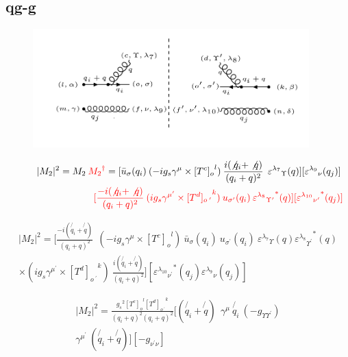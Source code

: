 \subsection{qg-g}
\begin{figure}[ht!]
\centering
\includegraphics[width=0.95\textwidth]{images/qggM2squer.png}
\end{figure}
\begin{equation}
\begin{split}
|M_2|^2=M_2\:{\color[RGB]{255,0,0} {M_2}^{\dagger}} = [{\bar{u}}_{\sigma}(q_i)\: (-ig_s \gamma^{\mu}\times {[T^c]_o}^l) \: \frac{i(\not{q_i} + \not{q})}{(q_i + q)^2}\:\: {\varepsilon^{\lambda_7}}_{\Upsilon} (q)] [{\varepsilon^{\lambda_9}}_{\nu} (q_j)]\: \\
\quad\quad\quad\quad\quad\quad\quad\quad\:\:{\color[RGB]{255,0,0}[\frac{-i(\not{q_i} + \not{q})}{(q_i + q)^2} \:  (ig_s \gamma^{{\mu}^{\prime}}\times {[T^d]_{o\:^{\prime}}}^k) \: u_{{\sigma}^{\prime}}(q_i) \: {{\varepsilon^{\lambda_8}}_{{\Upsilon}^{\prime}}}^* (q)][{{\varepsilon^{\lambda_{10}}}_{{\nu}^{\prime}}}^* (q_j)]}
\end{split}
\end{equation}

\begin{equation}
\begin{split}
|M_2|^2=[\frac{-i(\not{q_i} + \not{q})}{(q_i + q)^2} \:
 \:  (-ig_s \gamma^{\mu}\times {[T^c]_o}^l) \: {\bar{u}}_{\sigma}(q_i)\:u_{{\sigma}^{\prime}}(q_i) \: {\varepsilon^{\lambda_7}}_{\Upsilon} (q) {{\varepsilon^{\lambda_8}}_{{\Upsilon}^{\prime}}}^* (q) \\
\times (ig_s \gamma^{{\mu}^{\prime}}\times {[T^d]_{o\:^{\prime}}}^k) \: \frac{i(\not{q_i} + \not{q})}{(q_i + q)^2} ]
[{{\varepsilon^{\lambda_{10}}}_{{\nu}^{\prime}}}^* (q_j) {\varepsilon^{\lambda_9}}_{\nu} (q_j)]
\end{split}
\end{equation}

\begin{equation}
\begin{split}
|M_2|^2=\frac{{g_s}^2 {[T^c]_o}^l {[T^d]_{o\:^{\prime}}}^k}{(q_i + q)^2 (q_i + q)^2}
[(\not{q_i} + \not{q}) \:
 \:  \gamma^{\mu} \: \not{q_i} \: (-g_{{\Upsilon}{{\Upsilon}^{\prime}}}) \\
\gamma^{{\mu}^{\prime}} \: (\not{q_i} + \not{q})]
[-g_{{\nu}^{\prime}{\nu}}]
\end{split}
\end{equation}

